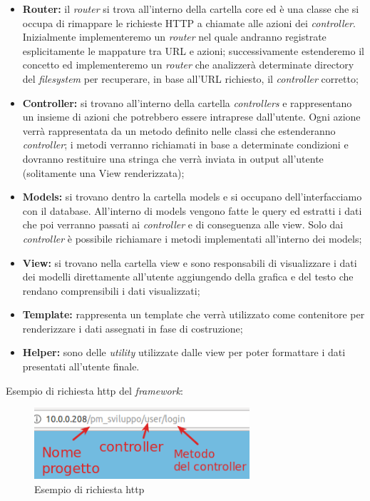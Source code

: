         \begin{itemize}
            \item \textbf{Router:} il \textit{router} si trova all'interno della cartella core ed è una classe che si occupa di rimappare le richieste HTTP a chiamate alle azioni dei \textit{controller}. Inizialmente implementeremo un \textit{router} nel quale andranno registrate esplicitamente le mappature tra URL e azioni; successivamente estenderemo il concetto ed implementeremo un \textit{router} che analizzerà determinate directory del \textit{filesystem} per recuperare, in base all'URL richiesto, il \textit{controller} corretto;
            
            \item \textbf{Controller:} si trovano all'interno della cartella \textit{controllers} e rappresentano un insieme di azioni che potrebbero essere intraprese dall'utente. Ogni azione verrà rappresentata da un metodo definito nelle classi che estenderanno \textit{controller}; i metodi verranno richiamati in base a determinate condizioni e dovranno restituire una stringa che verrà inviata in output all'utente (solitamente una View renderizzata);
            
            \item \textbf{Models:} si trovano dentro la cartella models e si occupano dell'interfacciamo con il database. All'interno di models vengono fatte le query ed estratti i dati che poi verranno passati ai \textit{controller} e di conseguenza alle view. Solo dai \textit{controller} è possibile richiamare i metodi implementati all'interno dei models;
            
            \item \textbf{View:} si trovano nella cartella view e sono responsabili di visualizzare i dati dei modelli direttamente all'utente aggiungendo della grafica e del testo che rendano comprensibili i dati visualizzati;
            
            \item \textbf{Template:} rappresenta un template che verrà utilizzato come contenitore per renderizzare i dati assegnati in fase di costruzione;
            
            \item \textbf{Helper:} sono delle \textit{utility} utilizzate dalle view per poter formattare i dati presentati all'utente finale.
        \end{itemize}
    Esempio di richiesta http del \textit{framework}:
    \begin{figure}[!h] 
        \centering 
        \includegraphics[width=8cm]{immagini/f12doc/b.png}
        \caption{Esempio di richiesta http}
    \end{figure}
